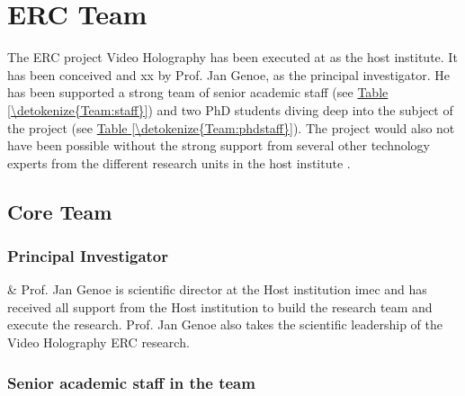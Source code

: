 \documentclass[a4paper,10pt,english,openany,oneside]{jupyterBook}
\begin{document}
\chapter{ERC Team}
\label{\detokenize{Team:erc-team}}\label{\detokenize{Team::doc}}
\sphinxAtStartPar
The ERC project Video Holography has been executed at  as the host institute. It has been conceived and xx by Prof. Jan Genoe, as the principal investigator. He has been supported a strong team of senior academic staff (see \hyperref[\detokenize{Team:staff}]{Table \ref{\detokenize{Team:staff}}}) and two PhD students diving deep into the subject of the project (see \hyperref[\detokenize{Team:phdstaff}]{Table \ref{\detokenize{Team:phdstaff}}}). The project would also not have been possible without the strong support from several other technology experts from the different research units in the host institute .


\section{Core Team}
\label{\detokenize{Team:core-team}}

\subsection{Principal Investigator}
\label{\detokenize{Team:principal-investigator}}

\begin{savenotes}\sphinxattablestart
\sphinxthistablewithglobalstyle
\centering
\begin{tabular}[t]{}
\sphinxtoprule
\sphinxtableatstartofbodyhook
\sphinxAtStartPar
{}
&
\sphinxAtStartPar
Prof. Jan Genoe is scientific director at the Host institution imec and has received all support from the Host institution to build the research team and execute the research. Prof. Jan Genoe also takes the scientific leadership of the Video Holography ERC research.
\\
\sphinxbottomrule
\end{tabular}
\sphinxtableafterendhook\par
\sphinxattableend\end{savenotes}


\subsection{Senior academic staff in the team}
\label{\detokenize{Team:senior-academic-staff-in-the-team}}
\end{document}
